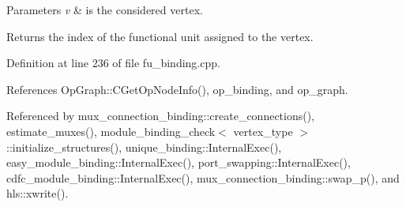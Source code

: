 \begin{DoxyParams}{Parameters}
{\em v} & is the considered vertex. \\
\hline
\end{DoxyParams}
\begin{DoxyReturn}{Returns}
the index of the functional unit assigned to the vertex. 
\end{DoxyReturn}


Definition at line 236 of file fu\+\_\+binding.\+cpp.



References Op\+Graph\+::\+C\+Get\+Op\+Node\+Info(), op\+\_\+binding, and op\+\_\+graph.



Referenced by mux\+\_\+connection\+\_\+binding\+::create\+\_\+connections(), estimate\+\_\+muxes(), module\+\_\+binding\+\_\+check$<$ vertex\+\_\+type $>$\+::initialize\+\_\+structures(), unique\+\_\+binding\+::\+Internal\+Exec(), easy\+\_\+module\+\_\+binding\+::\+Internal\+Exec(), port\+\_\+swapping\+::\+Internal\+Exec(), cdfc\+\_\+module\+\_\+binding\+::\+Internal\+Exec(), mux\+\_\+connection\+\_\+binding\+::swap\+\_\+p(), and hls\+::xwrite().

